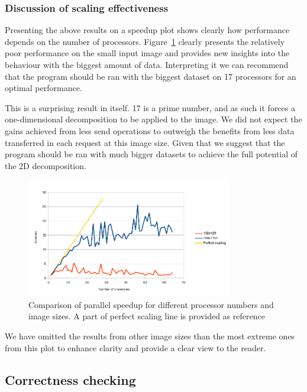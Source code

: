 \documentclass[11pt,a4paper]{article}
\begin{document}
\subsubsection{Discussion of scaling effectiveness}
Presenting the above results on a speedup plot shows clearly how performance depends on the number of processors.
Figure~\ref{fig:speedup} clearly presents the relatively poor performance on the small input image and provides new insights into the behaviour with the biggest amount of data.
Interpreting it we can recommend that the program should be ran with the biggest dataset on 17 processors for an optimal performance.

This is a surprising result in itself. 
17 is a prime number, and as such it forces a one-dimensional decomposition to be applied to the image.
We did not expect the gains achieved from less send operations to outweigh the benefits from less data transferred in each request at this image size.
Given that we suggest that the program should be ran with much bigger datasets to achieve the full potential of the 2D decomposition.

\begin{figure}[h!]
    \begin{center}
        \includegraphics[width=0.8\textwidth]{speedup.png}
    \end{center}
    \caption{Comparison of parallel speedup for different processor numbers and image sizes. A part of perfect scaling line is provided as reference}\label{fig:speedup}
\end{figure}

We have omitted the results from other image sizes than the most extreme ones from this plot to enhance clarity and provide a clear view to the reader.

\subsection{Correctness checking}
\end{document}

